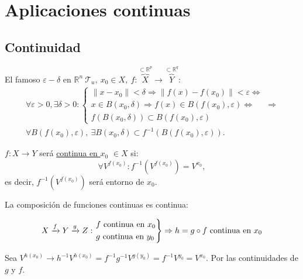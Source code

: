 \chapter{Aplicaciones continuas}%
\label{cha:aplicaciones_continuas}


\section{Continuidad}%
\label{sec:continuidad}
El famoso $\varepsilon-\delta$ en $\mathbb{R}^n\ \mathcal{T}_u,\ x_0 \in X,\ f : \overbrace{X}^{\subset \mathbb{R}^p} \rightarrow \overbrace{Y}^{\subset \mathbb{R}^q}$: 
\begin{gather*}        
\forall \varepsilon > 0, \exists \delta > 0: 
\begin{cases}
    \lVert x - x_0 \rVert < \delta \Rightarrow \lVert f\left( x \right) - f\left( x_0 \right) \rVert < \varepsilon \Leftrightarrow\\
    x \in B\left( x_0, \delta \right) \Rightarrow f\left( x \right) \in B\left( f\left( x_0 \right), \varepsilon \right) \Leftrightarrow\\
    f\left( B\left( x_0, \delta \right) \right) \subset B\left( f\left( x_0 \right), \varepsilon \right) 
\end{cases} \Rightarrow\\
\boxed{\forall B\left( f\left( x_0 \right), \varepsilon \right),\ \exists B\left( x_0, \delta \right) \subset f^{-1}\left( B\left( f\left( x_0 \right), \varepsilon \right) \right)} 
.\end{gather*}

\begin{defi}
$f: X \rightarrow Y$ será \underline{continua en $x_0$} $\in X$ si: 
\[
\forall V^{f\left( x_0 \right)}: f^{-1}\left( V^{f\left( x_0 \right)} \right) = V^{x_0},
\]
es decir, $f^{-1}\left( V^{f\left( x_0 \right)} \right)$ será entorno de $x_0$.
\end{defi}

\begin{prop}
La composición de funciones continuas es continua:

\[
X \xrightarrow{f} Y \xrightarrow{g} Z: \begin{rcases}
    f \text{ continua en } x_0\\
    g \text{ continua en } y_0
\end{rcases} \Rightarrow h = g \circ f \text{ continua en }  x_0
\]
\end{prop}
\begin{demo}
Sea $V^{h\left( x_0 \right)} \rightarrow h^{-1} V^{h\left( x_0 \right)} = f^{-1}g^{-1}V^{g\left( y_0 \right)} = f^{-1} V^{y_0} = V^{x_0}$. Por las continuidades de $g$ y $f$.
\end{demo}

